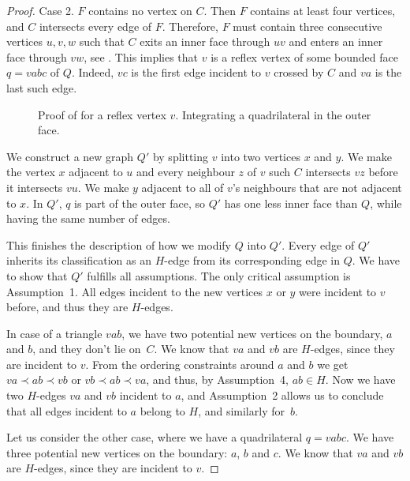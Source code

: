 \documentclass{patmorin}
\begin{document}
\begin{proof}
   
Case 2. $F$ contains no vertex on $C$.
Then $F$ contains at least four vertices, and $C$ intersects
   every edge of $F$.  Therefore,  
   $F$
    must contain three consecutive vertices
   $u,v,w$ such that $C$ exits an inner face through $uv$ and enters
   an inner face through $vw$, see .
  This implies that $v$ is a reflex vertex
   of some bounded face $q=vabc$ of $Q$.  Indeed, $vc$ is the first edge
   incident to $v$ crossed by $C$ and $va$ is the last such edge.

  \begin{figure}
     \caption{Proof of  for a reflex
       vertex $v$. Integrating a quadrilateral in the outer face.}
  \end{figure}
   

   We construct a new graph $Q'$ by splitting $v$ into two vertices $x$
   and $y$.  We make the vertex $x$ adjacent to $u$ and every neighbour
   $z$ of $v$ such $C$ intersects $vz$ before it intersects $vu$.  We make
   $y$ adjacent to all of $v$'s neighbours that are not adjacent to $x$.
   In $Q'$, $q$ is part of the outer face, so $Q'$ has one less inner
   face than $Q$, while having the same number of edges.

   This finishes the description of how we modify $Q$ into $Q'$.
Every edge of $Q'$ inherits its classification as an $H$-edge from
its corresponding edge in $Q$.
   We have
to
show that $Q'$ fulfills all assumptions.
The only critical assumption is Assumption~1.
All edges incident to the new vertices $x$ or $y$ were incident to $v$
before, and thus they are $H$-edges.

In case of a triangle $vab$, we have two potential new vertices on the
boundary, $a$ and $b$, and they don't lie on~$C$. We know that $va$
and $vb$ are $H$-edges, since they are incident to $v$.
From the ordering constraints around $a$ and $b$ we get
$va\prec ab\prec vb$
or
$vb\prec ab\prec va$, and thus, by Assumption~4, $ab\in H$.
Now we have two $H$-edges $va$ and $vb$ incident to $a$,
and Assumption~2 allows us to conclude that all edges incident
to $a$ belong to $H$, and similarly for~$b$.
   
Let us consider the other case, where we have a quadrilateral 
$q=vabc$.
We have three potential new vertices on the
boundary: $a$, $b$ and $c$. We know that $va$
and $vb$ are $H$-edges, since they are incident to $v$.


\end{proof}
\end{document}

